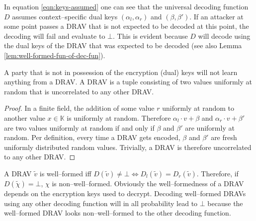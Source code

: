 \noindent{}In equation \ref{eqn:keys-assumed} one can see that the universal
decoding function $D$ assumes context--specific  dual keys $(\alpha_l,
\alpha_r)$ and $(\beta, \beta')$. If an attacker at some point passes a DRAV
that is not expected to be decoded at this point, the decoding will fail and
evaluate to $\bot$. This is evident because $D$ will decode using the dual keys
of the DRAV that was expected to be decoded (see also Lemma
\ref{lem:well-formed-fun-of-dec-fun}).

\begin{lem}
  \label{lem:DRAV-random}

  A party that is not in possession of the encryption (dual) keys will not learn
  anything from a DRAV\@. A DRAV is a tuple consisting of two values uniformly
  at random that is uncorrelated to any other DRAV\@.

\end{lem}
\begin{proof}

  In a finite field, the addition of some value $r$ uniformly at random to
  another value $x \in \mathbb{K}$ is uniformly at random. Therefore $\alpha_l
  \cdot v + \beta$ and $\alpha_r \cdot v + \beta'$ are two values uniformly at
  random if and only if $\beta$ and $\beta'$ are uniformly at random. Per
  definition, every time a DRAV gets encoded, $\beta$ and $\beta'$ are fresh
  uniformly distributed random values. Trivially, a DRAV is therefore
  uncorrelated to any other DRAV\@.

\end{proof}


\label{sec:well-formed-DRAV}

A DRAV $\widetilde{v}$ is well--formed iff $D(\widetilde{v}) \neq \bot
\Leftrightarrow D_l(\widetilde{v}) = D_r(\widetilde{v})$. Therefore, if
$D(\widetilde{\chi}) = \bot$, $\chi$ is non--well--formed. Obviously the
well--formedness of a DRAV depends on the encryption keys used to decrypt.
Decoding well--formed DRAVs using any other decoding function will in all
probability lead to $\bot$ because the well--formed DRAV looks non--well--formed
to the other decoding function.

